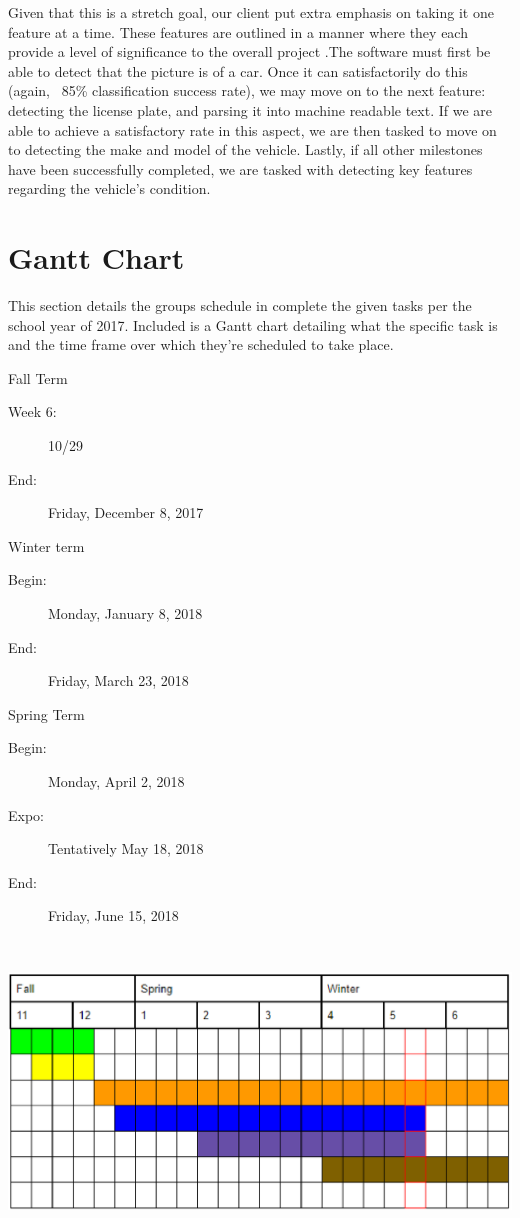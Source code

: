 \documentclass[onecolumn, draftclsnofoot,10pt, compsoc]{IEEEtran}
\begin{document}
Given that this is a stretch goal, our client put extra emphasis on taking it one feature at a time. These features are outlined in a manner where they each provide a level of significance to the overall project .The software must first be able to detect that the picture is of a car.  Once it can satisfactorily do this (again, ~85\% classification success rate), we may move on to the next feature: detecting the license plate, and parsing it into machine readable text. If we are able to achieve a satisfactory rate in this aspect, we are then tasked to move on to detecting the make and model of the vehicle. Lastly, if all other milestones have been successfully completed, we are tasked with detecting key features regarding the vehicle's condition. 

\section{Gantt Chart}

This section details the groups schedule in complete the given tasks per the school year of 2017. Included is a Gantt chart detailing what the specific task is and the time frame over which they're scheduled to take place.

Fall Term
\begin{description}
	\item[Week 6:]10/29
	\item[End:]   Friday, December 8, 2017
\end{description}


Winter term
\begin{description}
	\item[Begin:]Monday, January 8, 2018
	\item[End:]	 Friday, March 23, 2018
\end{description}


Spring Term
\begin{description}
	\item[Begin:]Monday, April 2, 2018
	\item[Expo:] 	Tentatively May 18, 2018
	\item[End:]			Friday, June 15, 2018
\end{description}



\includegraphics[height=8cm]{Gantt}
\end{document}
